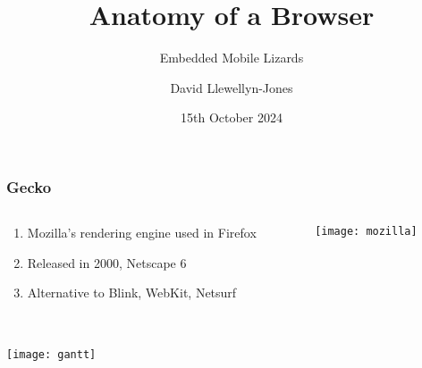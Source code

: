 \documentclass[
	notes=none,
	aspectratio=169
]{beamer}
\begin{document}
\title{Anatomy of a Browser}
\subtitle{Embedded Mobile Lizards}
\author{David Llewellyn-Jones}
\date{15th October 2024}


\renewcommand{\thefootnote}{\arabic{footnote}}

\frame{
\titlepage
}
\note{
}

\renewcommand{\thefootnote}{\fnsymbol{footnote}}


\begin{frame}
\frametitle{Gecko}

\begin{columns}[T]
\begin{column}[T]{0.5\textwidth}
\setlength{\parskip}{0.5em}

\vspace{1.5cm}
\begin{enumerate}
\setlength{\parskip}{0.5em}
\item Mozilla's rendering engine used in Firefox
\item Released in 2000, Netscape 6
\item Alternative to Blink, WebKit, Netsurf
\end{enumerate}

\end{column}
\begin{column}[T]{0.5\textwidth}
\setlength{\parskip}{0.5em}

\vspace{0.5cm}
\texttt{[image: mozilla]}

\end{column}
\end{columns}

\end{frame}


\begin{frame}
\frametitle{}

\begin{columns}[T]
\begin{column}[T]{1.05\textwidth}

\vspace{0.7cm}
\texttt{[image: gantt]}

\end{column}
\end{columns}

\end{frame}
\end{document}
